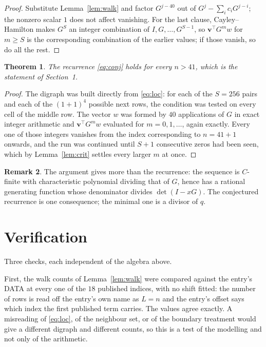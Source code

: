 \documentclass[11pt,a4paper]{article}
\theoremstyle{plain}
\newtheorem{theorem}{Theorem}
\theoremstyle{definition}
\newtheorem{remark}[theorem]{Remark}
\begin{document}
\begin{proof}
Substitute Lemma~\ref{lem:walk} and factor $G^{j-40}$ out of
$G^{j}-\sum_ic_iG^{j-i}$; the nonzero scalar $1$ does not affect
vanishing. For the last clause, Cayley--Hamilton makes $G^{S}$ an integer combination of
$I,G,\dots,G^{S-1}$, so $\mathbf{v}^{\!\top}G^{m}w$ for $m\ge S$ is the corresponding
combination of the earlier values; if those vanish, so do all the rest.
\end{proof}

\begin{theorem}
The recurrence \eqref{eq:conj} holds for every $n>41$, which is the statement of
Section~1.
\end{theorem}

\begin{proof}
The digraph was built directly from \eqref{eq:loc}: for each of the $S=256$ pairs and each
of the $(1+1)^{4}$ possible next rows, the condition was tested on every cell of
the middle row. The vector $w$ was formed by $40$ applications of $G$ in exact integer
arithmetic and $\mathbf{v}^{\!\top}G^{m}w$ evaluated for $m=0,1,\dots$, again exactly.
Every one of those integers vanishes from the index corresponding to $n=41+1$ onwards,
and the run was continued until $S+1$ consecutive zeros had been seen, which by
Lemma~\ref{lem:crit} settles every larger $m$ at once.
\end{proof}

\begin{remark}
The argument gives more than the recurrence: the sequence is $C$-finite with characteristic
polynomial dividing that of $G$, hence has a rational generating function whose denominator
divides $\det(I-xG)$. The conjectured recurrence is one consequence; the minimal one is a
divisor of $q$.
\end{remark}

\section{Verification}

Three checks, each independent of the algebra above.

First, the walk counts of Lemma~\ref{lem:walk} were compared against the entry's DATA at
every one of the $18$ published indices, with no shift fitted: the number of rows is
read off the entry's own name as $L=n$ and the entry's offset says which index the first
published term carries. The values agree exactly. A misreading of \eqref{eq:loc}, of the
neighbour set, or of the boundary treatment would give a different digraph and different
counts, so this is a test of the modelling and not only of the arithmetic.
\end{document}
